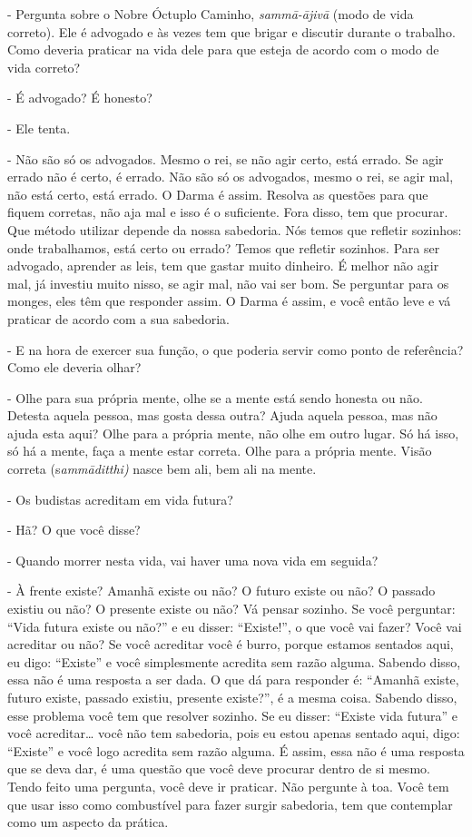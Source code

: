 - Pergunta sobre o Nobre Óctuplo Caminho,
\textit{sammā-ājivā }(modo de vida correto). Ele é advogado e às
vezes tem que brigar e discutir durante o trabalho. Como deveria
praticar na vida dele para que esteja de acordo com o modo de vida
correto?

- É advogado? É honesto?

- Ele tenta.

- Não são só os advogados. Mesmo o rei, se não agir certo, está
errado. Se agir errado não é certo, é errado. Não são só os advogados,
mesmo o rei, se agir mal, não está certo, está errado. O Darma é assim.
Resolva as questões para que fiquem corretas, não aja mal e isso é o
suficiente. Fora disso, tem que procurar. Que método utilizar depende
da nossa sabedoria. Nós temos que refletir sozinhos: onde trabalhamos,
está certo ou errado? Temos que refletir sozinhos. Para ser advogado,
aprender as leis, tem que gastar muito dinheiro. É melhor não agir mal,
já investiu muito nisso, se agir mal, não vai ser bom. Se perguntar
para os monges, eles têm que responder assim. O Darma é assim, e você
então leve e vá praticar de acordo com a sua sabedoria.

- E na hora de exercer sua função, o que poderia servir como ponto
de referência? Como ele deveria olhar?

- Olhe para sua própria mente, olhe se a mente está sendo honesta
ou não. Detesta aquela pessoa, mas gosta dessa outra? Ajuda aquela
pessoa, mas não ajuda esta aqui? Olhe para a própria mente, não olhe em
outro lugar. Só há isso, só há a mente, faça a mente estar correta.
Olhe para a própria mente. Visão correta (s\textit{ammāditthi) }nasce
bem ali, bem ali na mente.

- Os budistas acreditam em vida futura?

- Hã? O que você disse? 

- Quando morrer nesta vida, vai haver uma nova vida em seguida?

- À frente existe? Amanhã existe ou não? O futuro existe ou não? O
passado existiu ou não? O presente existe ou não? Vá pensar sozinho. Se
você perguntar: “Vida futura existe ou não?” e eu disser: “Existe!”, o
que você vai fazer? Você vai acreditar ou não? Se você acreditar você é
burro, porque estamos sentados aqui, eu digo: “Existe” e você
simplesmente acredita sem razão alguma. Sabendo disso, essa não é uma
resposta a ser dada. O que dá para responder é: “Amanhã existe, futuro
existe, passado existiu, presente existe?”, é a mesma coisa. Sabendo
disso, esse problema você tem que resolver sozinho. Se eu disser:
“Existe vida futura” e você acreditar… você não tem sabedoria, pois eu
estou apenas sentado aqui, digo: “Existe” e você logo acredita sem
razão alguma. É assim, essa não é uma resposta que se deva dar, é uma
questão que você deve procurar dentro de si mesmo. Tendo feito uma
pergunta, você deve ir praticar. Não pergunte à toa. Você tem que usar
isso como combustível para fazer surgir sabedoria, tem que contemplar
como um aspecto da prática.

